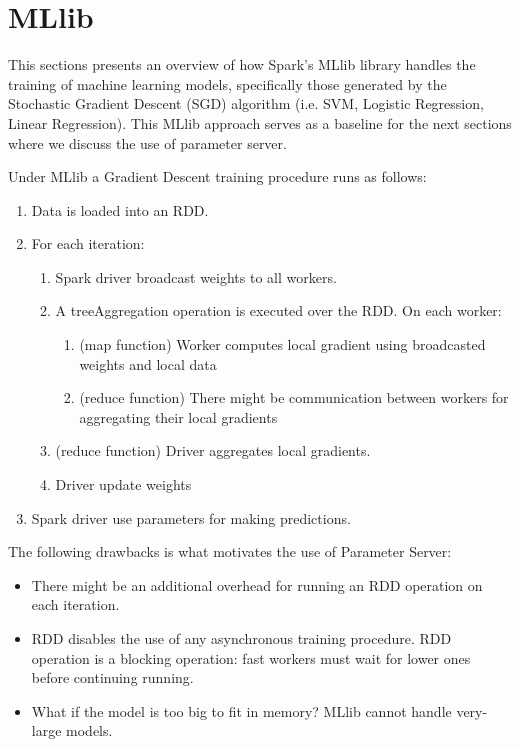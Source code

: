 \section*{MLlib}

This sections presents an overview of how Spark's MLlib library handles the training of machine learning models, specifically those generated by the Stochastic Gradient Descent (SGD) algorithm (i.e. SVM, Logistic
Regression, Linear Regression). This MLlib approach serves as a baseline for the next sections where we discuss the use of parameter server.

Under MLlib a Gradient Descent training procedure runs as follows:
\begin{enumerate}
  \item Data is loaded into an RDD.
  \item For each iteration:
  \begin{enumerate}[label*=\arabic*.]
    \item Spark driver broadcast weights to all workers.
    \item A treeAggregation operation is executed over the RDD. On each worker:
    \begin{enumerate}[label*=\arabic*.]
      \item (map function) Worker computes local gradient using broadcasted weights and local data
      \item (reduce function) There might be communication between workers for aggregating their local gradients
    \end{enumerate}
    \item (reduce function) Driver aggregates local gradients.
    \item Driver update weights
  \end{enumerate}
  \item Spark driver use parameters for making predictions.
\end{enumerate}

The following drawbacks is what motivates the use of Parameter Server:
\begin{itemize}
  \item There might be an additional overhead for running an RDD operation on each iteration.
  \item RDD disables the use of any asynchronous training procedure. RDD operation is a blocking operation: fast workers must wait for lower ones before continuing running.
  \item What if the model is too big to fit in memory? MLlib cannot handle very-large models.
\end{itemize}
